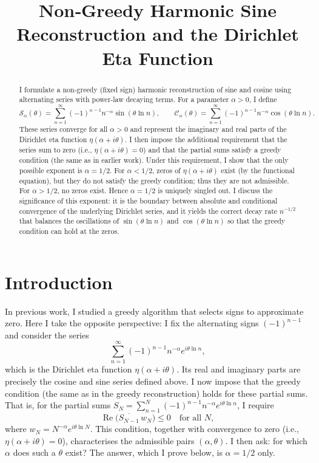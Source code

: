 \documentclass[12pt,a4paper]{article}
\title{Non‑Greedy Harmonic Sine Reconstruction and the Dirichlet Eta Function}
\author{}
\date{}
\begin{document}
\maketitle

\begin{abstract}
I formulate a non‑greedy (fixed sign) harmonic reconstruction of sine and cosine using alternating series with power‑law decaying terms. For a parameter $\alpha>0$, I define
\[
\mathcal{S}_\alpha(\theta)=\sum_{n=1}^\infty (-1)^{n-1}n^{-\alpha}\sin(\theta\ln n),\qquad
\mathcal{C}_\alpha(\theta)=\sum_{n=1}^\infty (-1)^{n-1}n^{-\alpha}\cos(\theta\ln n).
\]
These series converge for all $\alpha>0$ and represent the imaginary and real parts of the Dirichlet eta function $\eta(\alpha+i\theta)$. I then impose the additional requirement that the series sum to zero (i.e., $\eta(\alpha+i\theta)=0$) and that the partial sums satisfy a greedy condition (the same as in earlier work). Under this requirement, I show that the only possible exponent is $\alpha=1/2$. For $\alpha<1/2$, zeros of $\eta(\alpha+i\theta)$ exist (by the functional equation), but they do not satisfy the greedy condition; thus they are not admissible. For $\alpha>1/2$, no zeros exist. Hence $\alpha=1/2$ is uniquely singled out. I discuss the significance of this exponent: it is the boundary between absolute and conditional convergence of the underlying Dirichlet series, and it yields the correct decay rate $n^{-1/2}$ that balances the oscillations of $\sin(\theta\ln n)$ and $\cos(\theta\ln n)$ so that the greedy condition can hold at the zeros.
\end{abstract}

\section{Introduction}

In previous work, I studied a greedy algorithm that selects signs to approximate zero. Here I take the opposite perspective: I fix the alternating signs $(-1)^{n-1}$ and consider the series
\[
\sum_{n=1}^\infty (-1)^{n-1} n^{-\alpha} e^{i\theta\ln n},
\]
which is the Dirichlet eta function $\eta(\alpha+i\theta)$. Its real and imaginary parts are precisely the cosine and sine series defined above. I now impose that the greedy condition (the same as in the greedy reconstruction) holds for these partial sums. That is, for the partial sums $S_N = \sum_{n=1}^N (-1)^{n-1} n^{-\alpha} e^{i\theta\ln n}$, I require
\[
\operatorname{Re}\bigl(\overline{S_{N-1}} \, w_N\bigr) \le 0 \quad \text{for all } N,
\]
where $w_N = N^{-\alpha} e^{i\theta\ln N}$. This condition, together with convergence to zero (i.e., $\eta(\alpha+i\theta)=0$), characterises the admissible pairs $(\alpha,\theta)$. I then ask: for which $\alpha$ does such a $\theta$ exist? The answer, which I prove below, is $\alpha=1/2$ only.
\end{document}
